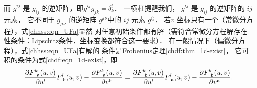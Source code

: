 而 $\bar{g}^{i j}$ 是 $g_{i j}$ 的逆矩阵，即$ \bar{g}^{i j} g_{j k}=\delta_k^i $．
一横杠提醒我们， $\bar{g}^{i j}$ 是 $g_{i j}$ 的逆矩阵的 $i j$ 元素，
它不同于 $g_{\mu \nu}$ 的逆矩阵 $g^{\mu \nu}$中的 $i j$ 元素 $g^{i j}$．
若$v$ 坐标只有一个（常微分方程），式\eqref{chhss:eqn_UFa}显然
对任意初始条件都有解（需符合常微分方程解存在性条件：Lipschitz条件．坐标变换都符合这一要求）．
在一般情况下（偏微分方程），式\eqref{chhss:eqn_UFa}有解的
条件是Frobenius定理\ref{chdf:thm_1d-exist}，
它可积的条件为式\eqref{chdf:eqn_1d-exist}，即
\begin{equation}\label{chhss:eqn_Frosn}
    \frac{\partial F^k_{\hphantom{k}\mathfrak{a}}(u, v)}{\partial u^l} F^l_{\hphantom{l}\mathfrak{b}}(u, v)
    -\frac{\partial F^k_{\hphantom{k}\mathfrak{a}}(u, v)}{\partial v^{\mathfrak{b}}} 
    =\frac{\partial F^k_{\hphantom{k}\mathfrak{b}}(u, v)}{\partial u^l} F^l_{\hphantom{l}\mathfrak{a}}(u, v)
    -\frac{\partial F^k_{\hphantom{k}\mathfrak{b}}(u, v)}{\partial v^{\mathfrak{a}}} .
\end{equation}


